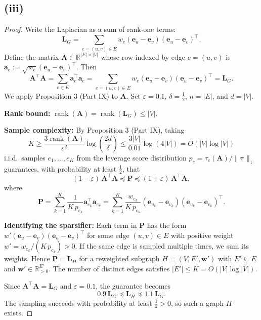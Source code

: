 \subsection*{(iii)}
\begin{proof}
Write the Laplacian as a sum of rank-one terms:
\[
\mathbf{L}_G = \sum_{e = (u,v) \in E} w_e (\mathbf{e}_u - \mathbf{e}_v)(\mathbf{e}_u - \mathbf{e}_v)^\top.
\]
Define the matrix $\mathbf{A} \in \mathbb{R}^{|E| \times |V|}$ whose row indexed by edge $e = (u,v)$ is $\mathbf{a}_e := \sqrt{w_e}(\mathbf{e}_u - \mathbf{e}_v)^\top$. Then
\[
\mathbf{A}^\top \mathbf{A} = \sum_{e \in E} \mathbf{a}_e^\top \mathbf{a}_e = \sum_{e = (u,v) \in E} w_e (\mathbf{e}_u - \mathbf{e}_v)(\mathbf{e}_u - \mathbf{e}_v)^\top = \mathbf{L}_G.
\]
We apply Proposition 3 (Part IX) to $\mathbf{A}$. Set $\varepsilon = 0.1$, $\delta = \tfrac{1}{2}$, $n = |E|$, and $d = |V|$.

\textbf{Rank bound:} $\operatorname{rank}(\mathbf{A}) = \operatorname{rank}(\mathbf{L}_G) \leq |V|$.

\textbf{Sample complexity:} By Proposition 3 (Part IX), taking
\[
K \geq \frac{3 \operatorname{rank}(\mathbf{A})}{\varepsilon^2} \log\!\left(\frac{2d}{\delta}\right) \leq \frac{3|V|}{0.01} \log(4|V|) = O(|V| \log |V|)
\]
i.i.d.\ samples $e_1, \ldots, e_K$ from the leverage score distribution $p_e = \tau_e(\mathbf{A}) / \|\boldsymbol{\tau}\|_1$ guarantees, with probability at least $\tfrac{1}{2}$, that
\[
(1 - \varepsilon)\,\mathbf{A}^\top \mathbf{A} \preceq \mathbf{P} \preceq (1 + \varepsilon)\,\mathbf{A}^\top \mathbf{A},
\]
where
\[
\mathbf{P} = \sum_{k=1}^{K} \frac{1}{K\, p_{e_k}} \mathbf{a}_{e_k}^\top \mathbf{a}_{e_k} = \sum_{k=1}^{K} \frac{w_{e_k}}{K\, p_{e_k}} (\mathbf{e}_{u_k} - \mathbf{e}_{v_k})(\mathbf{e}_{u_k} - \mathbf{e}_{v_k})^\top.
\]

\textbf{Identifying the sparsifier:} Each term in $\mathbf{P}$ has the form $w'(\mathbf{e}_u - \mathbf{e}_v)(\mathbf{e}_u - \mathbf{e}_v)^\top$ for some edge $(u,v) \in E$ with positive weight $w' = w_{e_k}/(K\, p_{e_k}) > 0$. If the same edge is sampled multiple times, we sum its weights. Hence $\mathbf{P} = \mathbf{L}_H$ for a reweighted subgraph $H = (V, E', \mathbf{w}')$ with $E' \subseteq E$ and $\mathbf{w}' \in \mathbb{R}_{>0}^{E'}$. The number of distinct edges satisfies $|E'| \leq K = O(|V| \log |V|)$.

Since $\mathbf{A}^\top \mathbf{A} = \mathbf{L}_G$ and $\varepsilon = 0.1$, the guarantee becomes
\[
0.9\, \mathbf{L}_G \preceq \mathbf{L}_H \preceq 1.1\, \mathbf{L}_G.
\]
The sampling succeeds with probability at least $\tfrac{1}{2} > 0$, so such a graph $H$ exists.
\end{proof}
